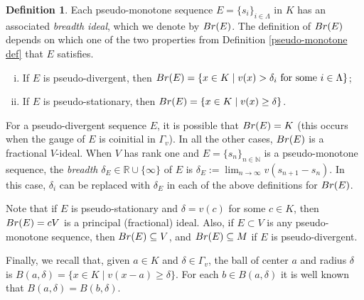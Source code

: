 \documentclass{article}
\theoremstyle{definition}\newtheorem{Def}[equation]{Definition}
\theoremstyle{definition}\newtheorem{Ques}[equation]{Question}
\theoremstyle{definition}\newtheorem{Conj}[equation]{Conjecture}
\theoremstyle{definition}\newtheorem{Not}[equation]{Notation}
\newcommand{\N}{\mathbb{N}}
\newcommand{\R}{\mathbb{R}}
\newcommand{\Br}{\textnormal{Br}}
\numberwithin{equation}{section}
\begin{document}
\begin{Def}\label{Breadth def} Each pseudo-monotone sequence $E = \{s_i\}_{i \in \Lambda}$ in $K$  has an associated \textit{breadth ideal}, which we denote by $\Br(E)$. The definition of $\Br(E)$ depends on which one of the two properties from Definition \ref{pseudo-monotone def} that $E$ satisfies.
\begin{enumerate}[(i)]
\item If $E$ is pseudo-divergent, then $\Br(E) = \{ x \in K \mid v(x) > \delta_{i} \text{ for some } i \in \Lambda\}$;
\item If $E$ is pseudo-stationary, then $\Br(E) = \{ x \in K \mid v(x) \geq \delta\}$.
\end{enumerate}
For a pseudo-divergent sequence $E$, it is possible that $\Br(E)=K$ (this occurs when the gauge of $E$ is coinitial in $\Gamma_v$). In all the other cases, $\Br(E)$ is a fractional $V$-ideal. When $V$ has rank one and $E=\{s_n\}_{n\in\N}$ is a pseudo-monotone sequence, the \textit{breadth} $\delta_E \in \R \cup \{\infty\}$ of $E$ is $\delta_E := \lim_{n \to \infty} v(s_{n+1}-s_n)$. In this case, $\delta_{i}$ can be replaced with $\delta_E$ in each of the above definitions for $\Br(E)$.
\end{Def}

Note that if $E$ is pseudo-stationary and $\delta = v(c)$ for some $c\in K$, then $\Br(E)=cV$ is a principal (fractional) ideal. Also, if $E \subset V$ is any pseudo-monotone sequence, then $\Br(E) \subseteq V$, and $\Br(E)\subseteq M$ if $E$ is pseudo-divergent.


Finally, we recall that, given $a\in K$ and $\delta\in\Gamma_v$, the ball of center $a$ and radius $\delta$ is $B(a,\delta)=\{x\in K\mid v(x-a)\geq\delta\}$. For each $b\in B(a,\delta)$ it is well known that $B(a,\delta)=B(b,\delta)$.
\end{document}
